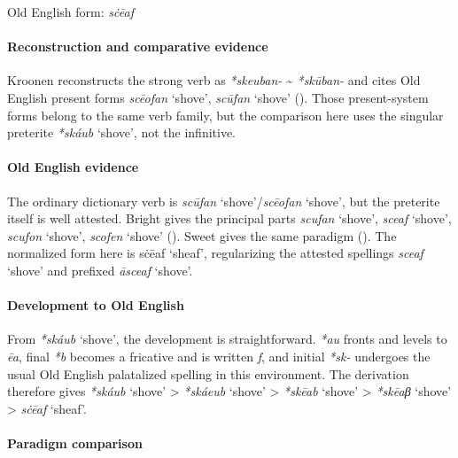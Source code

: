 \documentclass[
  british,
  a4paper,
]{article}
\providecommand{\Recon}[1]{\emph{*#1}}
\begin{document}
Old English form: \emph{sċēaf}

\paragraph{Reconstruction and comparative
evidence}\label{reconstruction-and-comparative-evidence-142}

Kroonen reconstructs the strong verb as \emph{*skeuban-}
\textasciitilde{} \emph{*skūban-} and cites Old English present forms
{\emph{scēofan}} `shove', {\emph{scūfan}} `shove'
(). Those present-system
forms belong to the same verb family, but the comparison here uses the
singular preterite \Recon{skáub} `shove', not the infinitive.

\paragraph{Old English evidence}\label{old-english-evidence-144}

The ordinary dictionary verb is {\emph{scūfan}} `shove'/{\emph{scēofan}}
`shove', but the preterite itself is well attested. Bright gives the
principal parts {\emph{scufan}} `shove', {\emph{sceaf}} `shove',
{\emph{scufon}} `shove', {\emph{scofen}} `shove'
(). Sweet gives
the same paradigm (). The
normalized form here is {sċēaf} `sheaf', regularizing the attested
spellings {\emph{sceaf}} `shove' and prefixed {\emph{āsceaf}} `shove'.

\paragraph{Development to Old
English}\label{development-to-old-english-143}

From \Recon{skáub} `shove', the development is straightforward.
\emph{*au} fronts and levels to \emph{ēa}, final \emph{*b} becomes a
fricative and is written \emph{f}, and initial \emph{*sk-} undergoes the
usual Old English palatalized spelling in this environment. The
derivation therefore gives \Recon{skáub} `shove' \textgreater{}
\Recon{skáeub} `shove' \textgreater{} \Recon{skēab} `shove'
\textgreater{} \Recon{skēaβ} `shove' \textgreater{} {\emph{sċēaf}}
`sheaf'.

\paragraph{Paradigm comparison}\label{paradigm-comparison-19}
\end{document}
